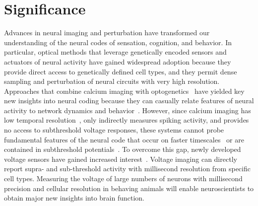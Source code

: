 \section{Significance}

Advances in neural imaging and perturbation have transformed our understanding of the neural
codes of sensation, cognition, and behavior. In particular, optical methods that leverage genetically encoded
sensors and actuators of neural activity have gained widespread adoption because they provide direct access
to genetically defined cell types, and they permit dense sampling and perturbation of neural circuits with very
high resolution. Approaches that combine  calcium imaging with  optogenetics~\cite{packer2014simultaneous,mardinly2018precise,yang2018simultaneous,rickgauer2014simultaneous,paluch2015all}
have yielded key new insights into neural coding because they can casually relate features of neural activity to network dynamics and behavior~\cite{marshel2019cortical,carrillo2019controlling,robinson2020targeted,daie2021targeted,carrillo2016imprinting,gill2020precise,forli2018two}. However, since calcium imaging has low temporal
resolution~\cite{chen2013ultrasensitive}, only indirectly measures spiking activity, and provides no access to subthreshold voltage
responses, these systems cannot probe fundamental features of the neural code that occur on faster timescales~\cite{gollisch2008rapid,butts2007temporal,berry1997structure,diesmann1999stable} or are contained in subthreshold potentials~\cite{sachidhanandam2013membrane,adesnik2017synaptic}. To overcome this  gap, newly developed voltage sensors have gained increased interest~\cite{}.
Voltage imaging
can directly report supra- and sub-threshold activity with millisecond resolution from specific cell types. 
Measuring the voltage of large numbers of
neurons with millisecond precision and cellular resolution in behaving animals  will enable neuroscientists to obtain major new insights into brain function.

